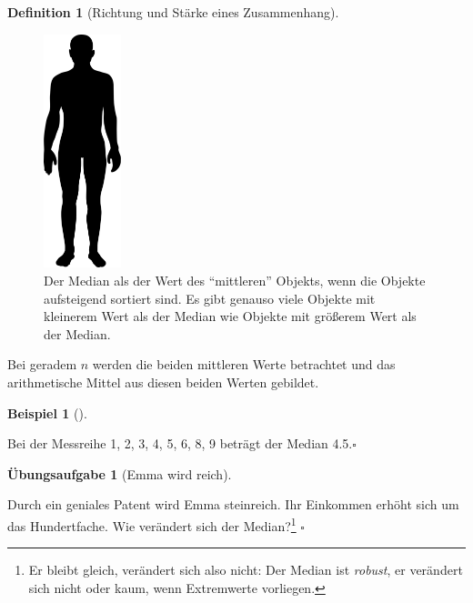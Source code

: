 \documentclass[
  a4paper,
  DIV=11]{scrreprt}
\theoremstyle{definition}
\newtheorem{exercise}{Übungsaufgabe}[chapter]
\theoremstyle{definition}
\newtheorem{example}{Beispiel}[chapter]
\theoremstyle{definition}
\newtheorem{definition}{Definition}[chapter]
\theoremstyle{remark}
\begin{document}
\begin{definition}[Richtung und Stärke eines
Zusammenhang]
\begin{figure}
\begin{minipage}{0.20\linewidth}
\end{minipage}%
%
\begin{minipage}{0.20\linewidth}

\includegraphics[width=0.2\textwidth,height=\textheight]{img/Human_Silhouette.svg.png}

\end{minipage}%

\caption{\label{fig-median-human}Der Median als der Wert des
``mittleren'' Objekts, wenn die Objekte aufsteigend sortiert sind. Es
gibt genauso viele Objekte mit kleinerem Wert als der Median wie Objekte
mit größerem Wert als der Median.}

\end{figure}%

Bei geradem \(n\) werden die beiden mittleren Werte betrachtet und das
arithmetische Mittel aus diesen beiden Werten gebildet.

\begin{example}[]\protect\hypertarget{exm-med2}{}\label{exm-med2}

Bei der Messreihe 1, 2, 3, 4, 5, 6, 8, 9 beträgt der Median
4.5.\(\square\)

\end{example}

\begin{exercise}[Emma wird
reich]\protect\hypertarget{exr-md2}{}\label{exr-md2}

Durch ein geniales Patent wird Emma steinreich. Ihr Einkommen erhöht
sich um das Hundertfache. Wie verändert sich der Median?\footnote{Er
  bleibt gleich, verändert sich also nicht: Der Median ist
  \emph{robust}, er verändert sich nicht oder kaum, wenn Extremwerte
  vorliegen.} \(\square\)


\end{exercise}
\end{definition}
\end{document}
